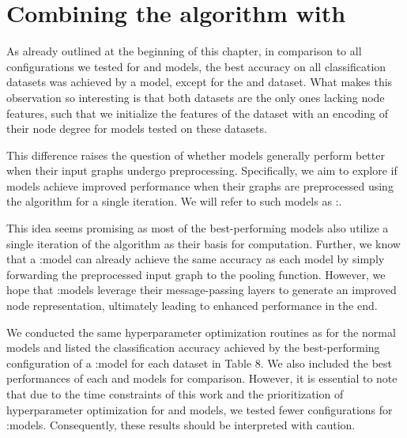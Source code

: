 \FloatBarrier
\section{Combining the \wl algorithm with \gnns}\label{sec:wl_with_gnn}
As already outlined at the beginning of this chapter, in comparison to all configurations we tested for \wlnn and \gnn models, the best accuracy on all classification datasets was achieved by a \wlnn model, except for the \imdb and \reddit dataset. What makes this observation so interesting is that both datasets are the only ones lacking node features, such that we initialize the features of the dataset with an encoding of their node degree for \gnn models tested on these datasets.

This difference raises the question of whether \gnn models generally perform better when their input graphs undergo preprocessing. Specifically, we aim to explore if \gnn models achieve improved performance when their graphs are preprocessed using the \wl algorithm for a single iteration. We will refer to such \gnn models as \wl:\gnn.

This idea seems promising as most of the best-performing \wlnn models also utilize a single iteration of the \wl algorithm as their basis for computation. Further, we know that a \wl:\gnn model can already achieve the same accuracy as each \wlnn model by simply forwarding the preprocessed input graph to the pooling function. However, we hope that \wl:\gnn models leverage their message-passing layers to generate an improved node representation, ultimately leading to enhanced performance in the end.

We conducted the same hyperparameter optimization routines as for the normal \gnn models and listed the classification accuracy achieved by the best-performing configuration of a \wl:\gnn model for each dataset in Table 8. We also included the best performances of each \wlnn and \gnn models for comparison. However, it is essential to note that due to the time constraints of this work and the prioritization of hyperparameter optimization for \gnn and \wlnn models, we tested fewer configurations for \wl:\gnn models. Consequently, these results should be interpreted with caution.

